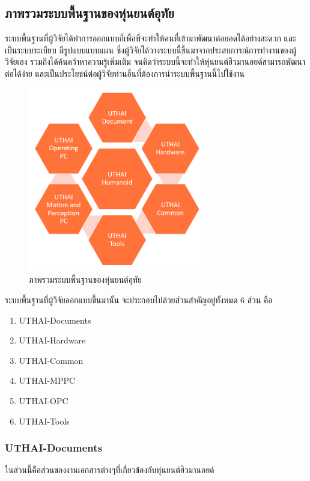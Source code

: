 \clearpage
\subsection{ภาพรวมระบบพื้นฐานของหุ่นยนต์อุทัย}
ระบบพื้นฐานที่ผู้วิจัยได้ทำการออกแบบก็เพื่อที่จะทำให้คนที่เข้ามาพัฒนาต่อยอดได้อย่างสะดวก และเป็นระบบระเบียบ
มีรูปแบบแบบแผน ซึ่งผู้วิจัยได้วางระบบนี้ขึ้นมาจากประสบการณ์การทำงานของผู้วิจัยเอง รวมถึงได้ค้นคว้าหาความรู้เพิ่มเติม
จนคิดว่าระบบนี้จะทำให้หุ่นยนต์ฮิวมานอยด์สามารถพัฒนาต่อได้ง่าย และเป็นประโยชน์ต่อผู้วิจัยท่านอื่นที่ต้องการนำระบบพื้นฐานนี้ไปใช้งาน

\begin{figure}[!ht]
	\centering
	\includegraphics[width=0.7\textwidth]{chapter4/images/uthai_platform.png}
	\caption{ภาพรวมระบบพื้นฐานของหุ่นยนต์อุทัย}
	\label{fig:uthai_platform}
\end{figure}

ระบบพื้นฐานที่ผู้วิจัยออกแบบขึ้นมานั้น จะประกอบไปด้วยส่วนสำคัญอยู่ทั้งหมด 6 ส่วน คือ
\vspace{-10pt}
\begin{enumerate}[label=\arabic*., leftmargin=2.5cm]
    \setlength\itemsep{-0.25em}
    \item UTHAI-Documents
    \item UTHAI-Hardware
    \item UTHAI-Common
    \item UTHAI-MPPC
    \item UTHAI-OPC
    \item UTHAI-Tools
\end{enumerate}

\clearpage
\subsubsection*{UTHAI-Documents}
ในส่วนนี้คือส่วนของงานเอกสารต่างๆที่เกี่ยวข้องกับหุ่นยนต์ฮิวมานอยด์

